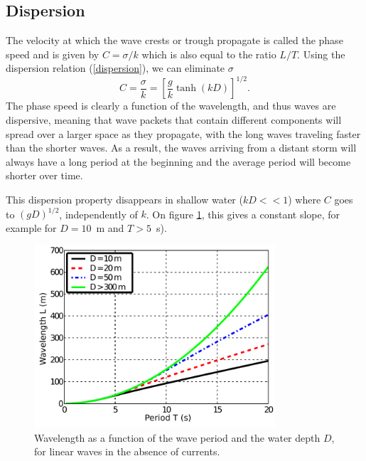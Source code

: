 \subsection{Dispersion}
The velocity at which the wave crests or trough propagate 
is called the phase speed and is given by $C=\sigma/k$ which is also equal to the ratio $L/T$. 
Using the dispersion relation (\ref{dispersion}), we can eliminate $\sigma$
\begin{equation}
    C= \frac{\sigma}{k}=\left[ \frac{g}{k}\tanh \left( kD\right)\right]^{1/2}.
\end{equation}
The phase speed is clearly a function of the wavelength, and thus waves are 
dispersive, meaning that wave packets that contain different components will 
spread over a larger space as they propagate, with the long waves traveling 
faster than the shorter waves. As a result, the waves arriving from a distant storm will 
always have a long period at the beginning and the average period will become shorter over time. 

This dispersion property disappears in shallow water  ($ kD << 1$)
where $C$ goes to $\left( gD\right)^{1/2}$, independently of $k$.
On figure \ref{disperlinLT}, this gives a constant slope, for example for $D=10$~m and $T>5$~s).
\begin{figure}
\centerline{\includegraphics[width=0.8\textwidth]{FIGS_CH_AIRY/disperlinLT_en.pdf}}
  \caption{Wavelength as a function of the wave period and the water depth $D$, for linear waves in the 
absence of currents.}
\label{disperlinLT}
\end{figure}

